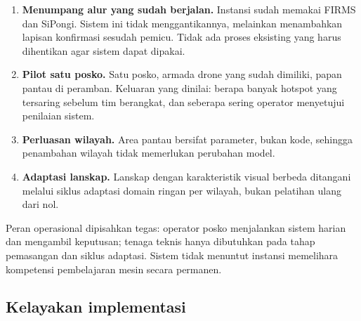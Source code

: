 \begin{enumerate}
\item \textbf{Menumpang alur yang sudah berjalan.} Instansi sudah memakai
FIRMS dan SiPongi. Sistem ini tidak menggantikannya, melainkan menambahkan
lapisan konfirmasi sesudah pemicu. Tidak ada proses eksisting yang harus
dihentikan agar sistem dapat dipakai.
\item \textbf{Pilot satu posko.} Satu posko, armada drone yang sudah dimiliki,
papan pantau di peramban. Keluaran yang dinilai: berapa banyak hotspot yang
tersaring sebelum tim berangkat, dan seberapa sering operator menyetujui
penilaian sistem.
\item \textbf{Perluasan wilayah.} Area pantau bersifat parameter, bukan kode,
sehingga penambahan wilayah tidak memerlukan perubahan model.
\item \textbf{Adaptasi lanskap.} Lanskap dengan karakteristik visual berbeda
ditangani melalui siklus adaptasi domain ringan per wilayah, bukan pelatihan
ulang dari nol.
\end{enumerate}

Peran operasional dipisahkan tegas: operator posko menjalankan sistem harian dan
mengambil keputusan; tenaga teknis hanya dibutuhkan pada tahap pemasangan dan
siklus adaptasi. Sistem tidak menuntut instansi memelihara kompetensi
pembelajaran mesin secara permanen.

\subsection*{Kelayakan implementasi}

